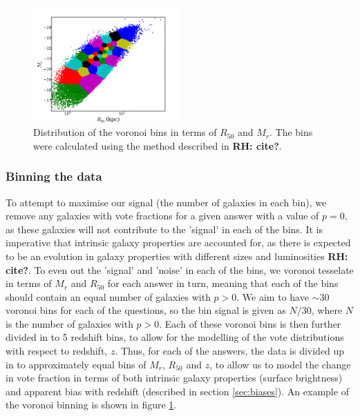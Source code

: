 \documentclass[useAMS,usenatbib]{mn2e}
\newcommand{\rh}[1]{{\bf \textcolor{RoyalPurple}{RH: #1}}}
\begin{document}
\begin{figure}
		\centering
		
        \includegraphics[width=0.5\textwidth]{Bias_imgs/voronoi_bins.pdf}
		
        \caption{Distribution of the voronoi bins in terms of $R_{50}$ and $M_r$. The bins were calculated using the method described in \rh{cite?}.} 
		
        \label{fig:voronoi_bins}
        
\end{figure}

\subsubsection{Binning the data}

To attempt to maximise our signal (the number of galaxies in each bin), we remove any galaxies with vote fractions for a given answer with a value of $p=0$, as these galaxies will not contribute to the 'signal' in each of the bins. It is imperative that intrinsic galaxy properties are accounted for, as there is expected to be an evolution in galaxy properties with different sizes and luminosities \rh{cite?}. To even out the 'signal' and 'noise' in each of the bins, we voronoi tesselate in terms of $M_r$ and $R_{50}$ for each answer in turn, meaning that each of the bins should contain an equal number of galaxies with $p>0$. We aim to have $\sim 30$ voronoi bins for each of the questions, so the bin signal is given as $N/30$, where $N$ is the number of galaxies with $p>0$. Each of these voronoi bins is then further divided in to 5 redshift bins, to allow for the modelling of the vote distributions with respect to redshift, $z$. Thus, for each of the answers, the data is divided up in to approximately equal bins of $M_r$, $R_{50}$ and $z$, to allow us to model the change in vote fraction in terms of both intrinsic galaxy properties (surface brightness) and apparent bias with redshift (described in section \ref{sec:biases}). An example of the voronoi binning is shown in figure \ref{fig:voronoi_bins}.
\end{document}
